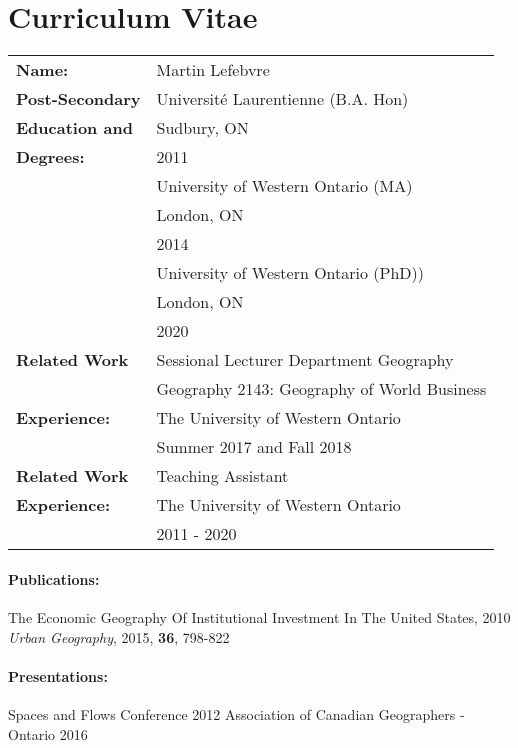 \documentclass[12pt,twoside]{report}
\numberwithin{figure}{chapter}
\newcommand{\firstname}{Martin}
\newcommand{\lastname}{Lefebvre}
\begin{document}
\chapter*{Curriculum Vitae}
\begin{table}[ht]
	\begin{tabular}{ll}
		\textbf{Name:} & \firstname{} \lastname\\
		
		
		\textbf{Post-Secondary} & Universit\'{e} Laurentienne (B.A. Hon)\\
		\textbf{Education and}& Sudbury, ON\\
		\textbf{Degrees:}& 2011\\
		& University of Western Ontario (MA)\\
		& London, ON\\
		& 2014 \\
		& University of Western Ontario (PhD))\\
		& London, ON\\
		& 2020 \\
		\textbf{Related Work}& Sessional Lecturer  Department Geography \\ 
		& Geography 2143: Geography of World Business\\
		\textbf{Experience:}& The University of Western Ontario\\
		& Summer 2017 and Fall 2018\\
		
		\textbf{Related Work}& Teaching Assistant\\
		\textbf{Experience:}& The University of Western Ontario\\
		& 2011 - 2020\\
	\end{tabular}
\end{table}
\subsubsection*{Publications:}
The Economic Geography Of Institutional Investment In The United States, 2010 
\textit{Urban Geography}, 2015, \textbf{36}, 798-822 

\subsubsection*{Presentations:}
Spaces and Flows Conference 2012 \newline
Association of Canadian Geographers - Ontario 2016
\end{document}
